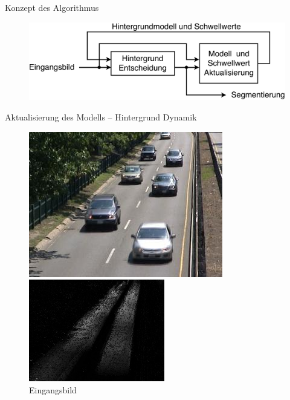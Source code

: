 \documentclass[hyperref={pdfpagelabels=false}]{beamer}
\begin{document}
\begin{frame}[t]{Konzept des Algorithmus}
	\bigskip
	\bigskip
	\bigskip 
	\begin{figure}
		\centering
		\includegraphics[width=1\linewidth]{Abbildungen/gesamt.pdf}
		\label{fig:Abbildungen/Grid}
	\end{figure}
\end{frame}


\begin{frame}[t]{Aktualisierung des Modells -- Hintergrund Dynamik}
	\vspace{1.65em}
	\begin{figure}
		\centering
		\begin{minipage}{0.45\linewidth}
			\includegraphics[width=1\linewidth]{Abbildungen/Eingang3.jpg}
			\caption*{Eingangsbild}
		\end{minipage}
		\begin{minipage}{0.45\linewidth}
			\includegraphics[width=1\linewidth]{Abbildungen/distance.jpg}

\end{minipage}
\end{figure}
\end{frame}
\end{document}
